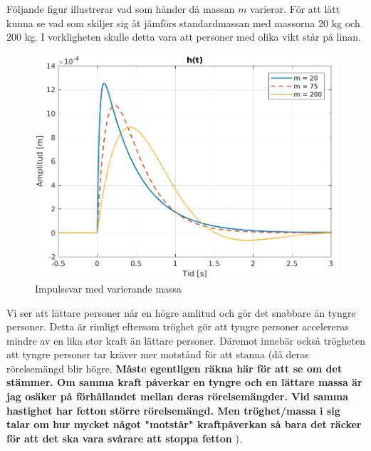 \newpage
Följande figur illustrerar vad som händer då massan $m$ varierar. För att lätt kunna se vad som skiljer sig åt jämförs standardmassan med massorna $20$ kg och $200$ kg. I verkligheten skulle detta vara att personer med olika vikt står på linan.
\begin{figure}[H]
    \centering
    \includegraphics[scale=0.9]{bilder/impulssvar_variation_m}
    \caption{Impulssvar med varierande massa}
    \label{fig:impulssvar_variation_m}
\end{figure}
Vi ser att lättare personer når en högre amlitud och gör det snabbare än tyngre personer. Detta är rimligt eftersom tröghet gör att tyngre personer accelereras mindre av en lika stor kraft än lättare personer. Däremot innebär också trögheten att tyngre personer tar kräver mer motstånd för att stanna (då deras rörelsemängd blir högre. \textbf{Måste egentligen räkna här för att se om det stämmer. Om samma kraft påverkar en tyngre och en lättare massa är jag osäker på förhållandet mellan deras rörelsemängder. Vid samma hastighet har fetton större rörelsemängd. Men tröghet/massa i sig talar om hur mycket något "motstår" kraftpåverkan så bara det räcker för att det ska vara svårare att stoppa fetton  }).

